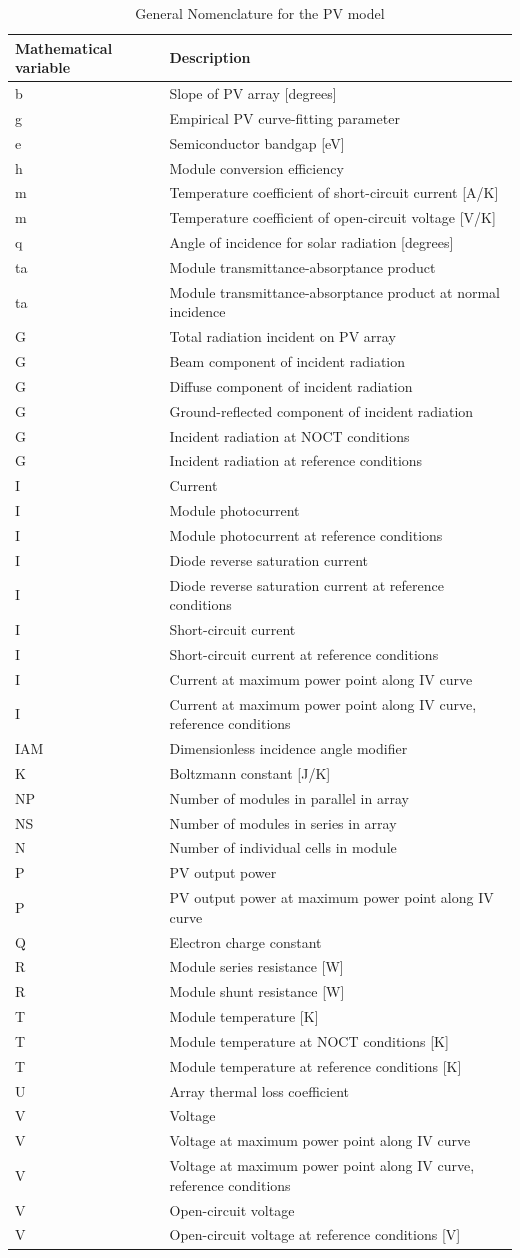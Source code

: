 \begin{longtable}[c]{p{1.5in}p{4.5in}}
\caption{General Nomenclature for the PV model \protect \label{table:general-nomenclature-for-the-pv-model}}\\
\toprule 
Mathematical variable & Description \tabularnewline \midrule
\endhead
b & Slope of PV array [degrees] \tabularnewline
g & Empirical PV curve-fitting parameter \tabularnewline
e & Semiconductor bandgap [eV] \tabularnewline
h & Module conversion efficiency \tabularnewline
m & Temperature coefficient of short-circuit current [A/K] \tabularnewline
m & Temperature coefficient of open-circuit voltage [V/K] \tabularnewline
q & Angle of incidence for solar radiation [degrees] \tabularnewline
ta & Module transmittance-absorptance product \tabularnewline
ta & Module transmittance-absorptance product at normal incidence \tabularnewline
G & Total radiation incident on PV array \tabularnewline
G & Beam component of incident radiation \tabularnewline
G & Diffuse component of incident radiation \tabularnewline
G & Ground-reflected component of incident radiation \tabularnewline
G & Incident radiation at NOCT conditions \tabularnewline
G & Incident radiation at reference conditions \tabularnewline
I & Current \tabularnewline
I & Module photocurrent \tabularnewline
I & Module photocurrent at reference conditions \tabularnewline
I & Diode reverse saturation current \tabularnewline
I & Diode reverse saturation current at reference conditions \tabularnewline
I & Short-circuit current \tabularnewline
I & Short-circuit current at reference conditions \tabularnewline
I & Current at maximum power point along IV curve \tabularnewline
I & Current at maximum power point along IV curve, reference conditions \tabularnewline
IAM & Dimensionless incidence angle modifier \tabularnewline
K & Boltzmann constant [J/K] \tabularnewline
NP & Number of modules in parallel in array \tabularnewline
NS & Number of modules in series in array \tabularnewline
N & Number of individual cells in module \tabularnewline
P & PV output power \tabularnewline
P & PV output power at maximum power point along IV curve \tabularnewline
Q & Electron charge constant \tabularnewline
R & Module series resistance [W] \tabularnewline
R & Module shunt resistance [W] \tabularnewline
T­ & Module temperature [K] \tabularnewline
T & Module temperature at NOCT conditions [K] \tabularnewline
T & Module temperature at reference conditions [K] \tabularnewline
U & Array thermal loss coefficient \tabularnewline
V & Voltage \tabularnewline
V & Voltage at maximum power point along IV curve \tabularnewline
V & Voltage at maximum power point along IV curve, reference conditions \tabularnewline
V­ & Open-circuit voltage \tabularnewline
V & Open-circuit voltage at reference conditions [V] \tabularnewline
\bottomrule
\end{longtable}

